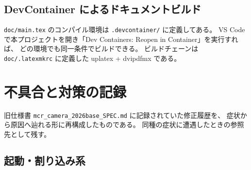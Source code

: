 \documentclass[a4paper,11pt,dvipdfmx]{jsarticle}
\begin{document}
\subsection{DevContainer によるドキュメントビルド}\label{sec:devcontainer}

\texttt{doc/main.tex} のコンパイル環境は \texttt{.devcontainer/} に定義してある。
VS Code で本プロジェクトを開き「Dev Containers: Reopen in Container」を実行すれば、
どの環境でも同一条件でビルドできる。
ビルドチェーンは \texttt{doc/.latexmkrc} に定義した uplatex + dvipdfmx である。

\appendix
\section{不具合と対策の記録}\label{sec:troubleshooting}

旧仕様書 \texttt{mcr\_camera\_2026base\_SPEC.md} に記録されていた修正履歴を、
症状から原因へ辿れる形に再構成したものである。
同種の症状に遭遇したときの参照先として残す。

\subsection{起動・割り込み系}
\end{document}
